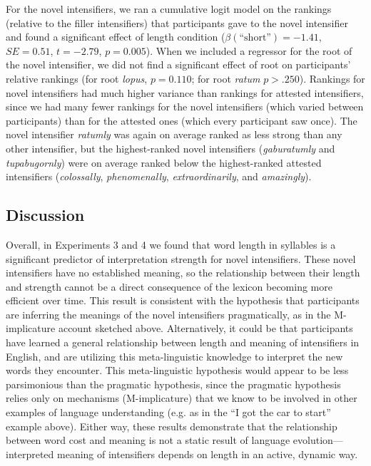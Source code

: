 \documentclass[10pt,letterpaper]{article}
\newcommand{\w}[1]{\emph{#1}}
\newcommand{\ndg}[1]{{\color{green}#1}}
\begin{document}
For the novel intensifiers, we ran a cumulative logit model on the rankings (relative to the filler intensifiers) that participants gave to the novel intensifier and found a significant effect of length condition ($\beta(\mbox{``short''})=-1.41$, $SE=0.51$, $t=-2.79$, $p=0.005$).
When we included a regressor for the root of the novel intensifier, we did not find a significant effect of root on participants' relative rankings (for root \w{lopus}, $p=0.110$; for root \w{ratum} $p>.250$).
Rankings for novel intensifiers had much higher variance than rankings for attested intensifiers, since we had many fewer rankings for the novel intensifiers (which varied between participants) than for the attested ones (which every participant saw once). The novel intensifier \w{ratumly} was again on average ranked as less strong than any other intensifier, but the highest-ranked novel intensifiers (\w{gaburatumly} and \w{tupabugornly}) were on average ranked below the highest-ranked attested intensifiers (\w{colossally}, \w{phenomenally}, \w{extraordinarily}, and \w{amazingly}).


\subsection{Discussion}
Overall, in Experiments 3 and 4 we found that word length in syllables is a significant predictor of interpretation strength for novel intensifiers. These novel intensifiers have no established meaning, so the relationship between their length and strength cannot be a direct consequence of the lexicon becoming more efficient over time. This result is consistent with the hypothesis that participants are inferring the meanings of the novel intensifiers pragmatically, as in the M-implicature account sketched above. 
Alternatively, it could be that participants have learned a general relationship between length and meaning of intensifiers in English, and are utilizing this meta-linguistic knowledge to interpret the new words they encounter. 
This meta-linguistic hypothesis would appear to be less parsimonious than the pragmatic hypothesis, since the pragmatic hypothesis relies only on mechanisms (M-implicature) that we know to be involved in other examples of language understanding (e.g. as in the ``I got the car to start'' example above).
Either way, these results demonstrate that the relationship between word cost and meaning is not a static result of language evolution---interpreted meaning of intensifiers depends on length in an active, dynamic way.
\end{document}
